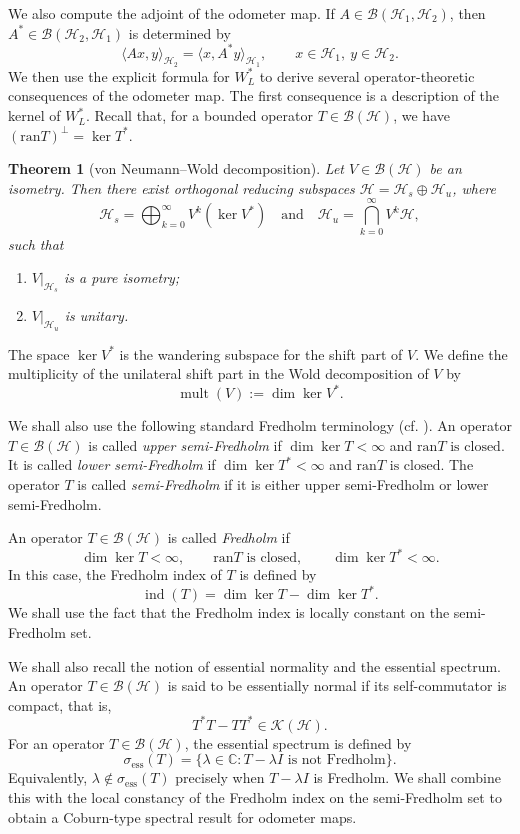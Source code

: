 \documentclass[12pt]{amsart}
\newtheorem{theorem}{Theorem}[section]
\theoremstyle{definition}
\theoremstyle{remark}
\newcommand{\clb}{\mathcal{B}}
\newcommand{\clh}{\mathcal{H}}
\newcommand{\clk}{\mathcal{K}}
\newcommand{\ran}{\mathrm{ran}}
\newcommand{\ind}{\operatorname{ind}}
\newcommand\restr[2]{\ensuremath{\left.#1\right|_{#2}}}
\numberwithin{equation}{section}
\begin{document}
We also compute the adjoint of the odometer map. 
If \(A\in\clb(\clh_1,\clh_2)\), then \(A^*\in
\clb(\clh_2,\clh_1)\) is determined by
\[
\langle Ax,y\rangle_{\clh_2}
=
\langle x,A^*y\rangle_{\clh_1},
\qquad x\in\clh_1,\ y\in\clh_2.
\]
We then use the explicit formula for $W_L^*$ to derive several
operator-theoretic consequences of the odometer map. The first consequence is a description of the kernel of $W_L^*$. Recall that, for a bounded operator $T\in\clb(\clh)$, we have $(\ran T)^\perp=\ker T^*.$



\begin{theorem}[von Neumann--Wold decomposition]
Let $V\in \clb(\clh)$ be an isometry. Then there exist orthogonal reducing subspaces $\clh=\clh_s\oplus \clh_u$,
where
\[
\clh_s=\bigoplus_{k=0}^{\infty}V^k(\ker V^*)
\quad\text{and}\quad
\clh_u=\bigcap_{k=0}^{\infty}V^k\clh,
\]
such that
\begin{enumerate}
    \item $\restr{V}{\clh_s}$ is a pure isometry;
    \item $\restr{V}{\clh_u}$ is unitary.
\end{enumerate}
\end{theorem}
The space \(\ker V^*\) is the wandering subspace for the shift part of \(V\).
We define the multiplicity of the unilateral shift part in the Wold
decomposition of \(V\) by
\[
\operatorname{mult}(V):=\dim\ker V^*.
\]

We shall also use the following standard Fredholm terminology
(cf. \cite{atkinson1948}). An operator \(T\in\clb(\clh)\) is called
\emph{upper semi-Fredholm} if $\dim\ker T<\infty$ and $\ran T \text{ is closed}.$
It is called \emph{lower semi-Fredholm} if $\dim\ker T^*<\infty$ and $\ran T \text{ is closed}.$
The operator \(T\) is called \emph{semi-Fredholm} if it is either upper
semi-Fredholm or lower semi-Fredholm.

An operator \(T\in\clb(\clh)\) is called \emph{Fredholm} if
\[
\dim\ker T<\infty,\qquad
\ran T \text{ is closed},
\qquad
\dim\ker T^*<\infty.
\]
In this case, the Fredholm index of \(T\) is defined by
\[
\ind(T)=\dim\ker T-\dim\ker T^*.
\]
We shall use the fact that the Fredholm index is locally constant on the
semi-Fredholm set.

We shall also recall the notion of essential normality and the essential spectrum. An operator $T\in\clb(\clh)$ is said to be essentially normal if its self-commutator is compact, that is,
\[
T^*T-TT^*\in \clk(\clh).
\]
For an operator $T\in\clb(\clh)$, the essential spectrum is defined by
\[
\sigma_{\mathrm{ess}}(T)
=
\{\lambda\in\mathbb C: T-\lambda I \text{ is not Fredholm}\}.
\]
Equivalently, $\lambda\notin\sigma_{\mathrm{ess}}(T)$ precisely when $T-\lambda I$ is Fredholm. We shall combine this with the local constancy of the Fredholm index on the semi-Fredholm set to obtain a Coburn-type spectral result for odometer maps.
\end{document}
